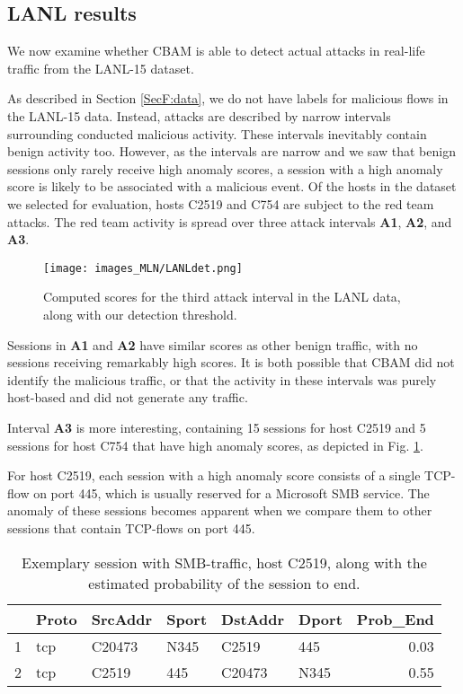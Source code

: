 \subsection{LANL results}

We now examine whether CBAM is able to detect actual attacks in real-life traffic from the LANL-15 dataset.

As described in Section \ref{SecF:data}, we do not have labels for malicious flows in the LANL-15 data. Instead, attacks are described by narrow intervals surrounding conducted malicious activity. These intervals inevitably contain benign activity too. However, as the intervals are narrow and we saw that benign sessions only rarely receive high anomaly scores, a session with a high anomaly score is likely to be associated with a malicious event. Of the hosts in the dataset we selected for evaluation, hosts C2519 and C754 are subject to the red team attacks. The red team activity is spread over three attack intervals \textbf{A1}, \textbf{A2}, and \textbf{A3}. 

\begin{figure}[ht]
\centering
\texttt{[image: images\_MLN/LANLdet.png]} \caption{Computed scores for the third attack interval in the LANL data, along with our detection threshold.}\label{figF:LANLdetection}
\end{figure}

Sessions in \textbf{A1} and \textbf{A2} have similar scores as other benign traffic, with no sessions receiving remarkably high scores. It is both possible that CBAM did not identify the malicious traffic, or that the activity in these intervals was purely host-based and did not generate any traffic. 

Interval \textbf{A3} is more interesting, containing 15 sessions for host C2519 and 5 sessions for host C754 that have high anomaly scores, as depicted in Fig. \ref{figF:LANLdetection}.






For host C2519, each session with a high anomaly score consists of a single TCP-flow on port 445, which is usually reserved for a Microsoft SMB service. The anomaly of these sessions becomes apparent when we compare them to other sessions that contain TCP-flows on port 445. 

\begin{table}[ht]
\centering
\begin{tabular}{rlllllr}
  \hline
 & Proto & SrcAddr & Sport & DstAddr & Dport & Prob\_End \\ 
  \hline
1 & tcp & C20473 & N345 & C2519 & 445 & 0.03 \\ 
  2 & tcp & C2519 & 445 & C20473 & N345 & 0.55 \\ 
   \hline
\end{tabular}
\caption{Exemplary session with SMB-traffic,  host C2519, along with the estimated probability of the session to end.} 
\label{tabF:MalSessionLANL}
\end{table}

